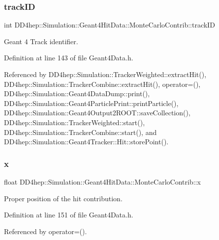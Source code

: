 \subsubsection{\texorpdfstring{track\+ID}{trackID}}
{\footnotesize\ttfamily int D\+D4hep\+::\+Simulation\+::\+Geant4\+Hit\+Data\+::\+Monte\+Carlo\+Contrib\+::track\+ID}



Geant 4 Track identifier. 



Definition at line 143 of file Geant4\+Data.\+h.



Referenced by D\+D4hep\+::\+Simulation\+::\+Tracker\+Weighted\+::extract\+Hit(), D\+D4hep\+::\+Simulation\+::\+Tracker\+Combine\+::extract\+Hit(), operator=(), D\+D4hep\+::\+Simulation\+::\+Geant4\+Data\+Dump\+::print(), D\+D4hep\+::\+Simulation\+::\+Geant4\+Particle\+Print\+::print\+Particle(), D\+D4hep\+::\+Simulation\+::\+Geant4\+Output2\+R\+O\+O\+T\+::save\+Collection(), D\+D4hep\+::\+Simulation\+::\+Tracker\+Weighted\+::start(), D\+D4hep\+::\+Simulation\+::\+Tracker\+Combine\+::start(), and D\+D4hep\+::\+Simulation\+::\+Geant4\+Tracker\+::\+Hit\+::store\+Point().

\hypertarget{class_d_d4hep_1_1_simulation_1_1_geant4_hit_data_1_1_monte_carlo_contrib_af10634172fe6990ae8f588ba109c1c0f}{}\label{class_d_d4hep_1_1_simulation_1_1_geant4_hit_data_1_1_monte_carlo_contrib_af10634172fe6990ae8f588ba109c1c0f} 
\subsubsection{\texorpdfstring{x}{x}}
{\footnotesize\ttfamily float D\+D4hep\+::\+Simulation\+::\+Geant4\+Hit\+Data\+::\+Monte\+Carlo\+Contrib\+::x}



Proper position of the hit contribution. 



Definition at line 151 of file Geant4\+Data.\+h.



Referenced by operator=().

\hypertarget{class_d_d4hep_1_1_simulation_1_1_geant4_hit_data_1_1_monte_carlo_contrib_afc4f5cb38a61ece64df14416ae637cbb}{}\label{class_d_d4hep_1_1_simulation_1_1_geant4_hit_data_1_1_monte_carlo_contrib_afc4f5cb38a61ece64df14416ae637cbb} 
